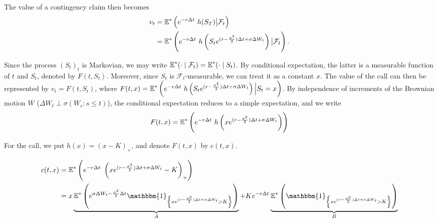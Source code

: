The value of a contingency claim then becomes
\begin{align*}
	v_t  &=  \operatorname{\mathbb{E}}^* \left( e^{-r \Delta t} \  h(S_T)  \big|  \mathcal{F}_t \right)  \\
	     &=  \operatorname{\mathbb{E}}^* \left( e^{-r \Delta t} \  h \left(S_t e^{ ( r - \frac{\sigma^2}{2} ) \Delta t + \sigma \Delta W_t } \right)  \big|  \mathcal{F}_t \right) .
\end{align*}

Since the process $ (S_t)_t $ is Markovian, we may write $ \operatorname{\mathbb{E}}^*(\cdot \mid \mathcal{F}_t) = \operatorname{\mathbb{E}}^*(\cdot \mid S_t) $. By conditional expectation, the latter is a measurable function of $ t $ and $ S_t $, denoted by $ F(t, S_t) $. Moreover, since $ S_t $ is $ \mathcal{F}_t $-measurable, we can treat it as a constant $ x $. The value of the call can then be represented by $ v_t = F(t, S_t) $, where $ F(t,x) = \operatorname{\mathbb{E}}^* \left( e^{-r \Delta t} \  h \left( S_t e^{ ( r - \frac{\sigma^2}{2} ) \Delta t + \sigma \Delta W_t } \right)  \Big|  S_t = x \right) $. By independence of increments of the Brownian motion $ W $ ($ \Delta W_t \perp \sigma(W_s : s \le t) $), the conditional expectation reduces to a simple expectation, and we write
\begin{equation*}
	F(t, x)  =  \operatorname{\mathbb{E}}^* \left( e^{-r \Delta t} \  h \left( x e^{ ( r - \frac{\sigma^2}{2} ) \Delta t + \sigma \Delta W_t } \right) \right)
\end{equation*}

For the call, we put $ h(x) = (x - K)_+ $, and denote $ F(t, x) $ by $ c(t, x) $.

\begin{align*}
	c(t, x)  &=  \E^* \left( e^{-r \Delta t} \  \left( x e^{ ( r - \frac{\sigma^2}{2} ) \Delta t + \sigma \Delta W_t } - K  \right)_+  \right)  \\
	&=  x \underbrace{ \E^* \left( e^{ \sigma \Delta W_t - \frac{\sigma^2}{2} \Delta t }  \mathbbm{1}_{ \left\lbrace  x e^{ ( r - \frac{\sigma^2}{2} ) \Delta t + \sigma \Delta W_t } > K  \right\rbrace }  \right) }_{A}  +  K e^{-r \Delta t}  \underbrace{ \E^* \left(  \mathbbm{1}_{ \left\lbrace  x e^{ ( r - \frac{\sigma^2}{2} ) \Delta t + \sigma \Delta W_t } > K  \right\rbrace }  \right) }_{B}
\end{align*}

